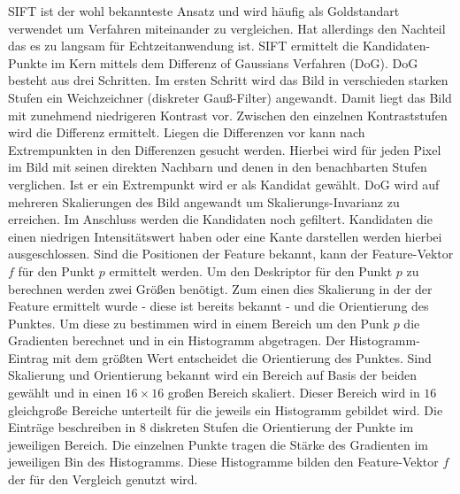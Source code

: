 \documentclass[12pt,titlepage, twoside]{article}
\begin{document}
SIFT ist der wohl bekannteste Ansatz und wird häufig als Goldstandart verwendet um Verfahren miteinander zu vergleichen. Hat allerdings den Nachteil das es zu langsam für Echtzeitanwendung ist.
SIFT ermittelt die Kandidaten-Punkte im Kern mittels dem Differenz of Gaussians Verfahren (DoG). DoG besteht aus drei Schritten. Im ersten Schritt wird das Bild in verschieden starken Stufen ein Weichzeichner (diskreter Gauß-Filter) angewandt.
Damit liegt das Bild mit zunehmend niedrigeren Kontrast vor. Zwischen den einzelnen Kontraststufen wird die Differenz ermittelt. Liegen die Differenzen vor kann nach Extrempunkten in den Differenzen gesucht werden.
Hierbei wird für jeden Pixel im Bild mit seinen direkten Nachbarn und denen in den benachbarten Stufen verglichen. Ist er ein Extrempunkt wird er als Kandidat gewählt.
DoG wird auf mehreren Skalierungen des Bild angewandt um Skalierungs-Invarianz zu erreichen.
Im Anschluss werden die Kandidaten noch gefiltert. Kandidaten die einen niedrigen Intensitätswert haben oder eine Kante darstellen werden hierbei ausgeschlossen.
Sind die Positionen der Feature bekannt, kann der Feature-Vektor $f$ für den Punkt $p$ ermittelt werden. 
Um den Deskriptor für den Punkt $p$ zu berechnen werden zwei Größen benötigt. Zum einen dies Skalierung in der der Feature ermittelt wurde - diese ist bereits bekannt - und die Orientierung des Punktes.
Um diese zu bestimmen wird in einem Bereich um den Punk $p$ die Gradienten berechnet und in ein Histogramm abgetragen. Der Histogramm-Eintrag mit dem größten Wert entscheidet die Orientierung des Punktes.
Sind Skalierung und Orientierung bekannt wird ein Bereich auf Basis der beiden gewählt und in einen $16\times 16$ großen Bereich skaliert. 
Dieser Bereich wird in $16$ gleichgroße Bereiche unterteilt für die jeweils ein Histogramm gebildet wird. 
Die Einträge beschreiben in $8$ diskreten Stufen die Orientierung der Punkte im jeweiligen Bereich. Die einzelnen Punkte tragen die Stärke des Gradienten im jeweiligen Bin des Histogramms.
Diese Histogramme bilden den Feature-Vektor $f$ der für den Vergleich genutzt wird.
\end{document}
